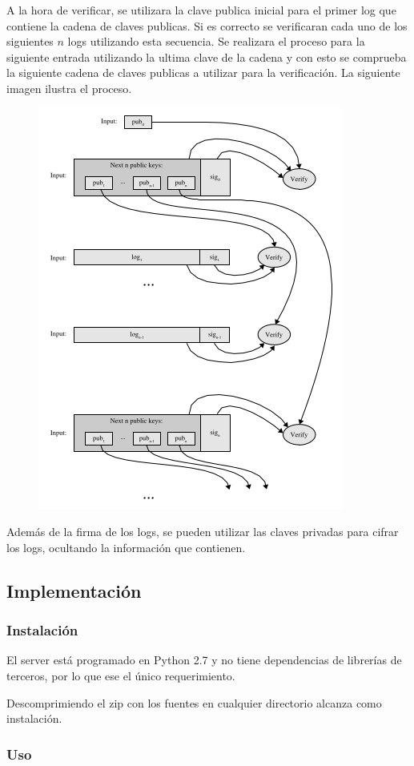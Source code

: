 A la hora de verificar, se utilizara la clave publica inicial para el primer log que contiene la cadena de claves publicas. Si es correcto se verificaran cada uno de los siguientes $n$ logs utilizando esta secuencia. Se realizara el proceso para la siguiente entrada utilizando la ultima clave de la cadena y con esto se comprueba la siguiente cadena de claves publicas a utilizar para la verificación. La siguiente imagen ilustra el proceso.
\begin{figure}[H]
\centering
\includegraphics[scale=0.4]{imagenes/PublicKeyVerification.png}
\end{figure}
  
Además de la firma de los logs, se pueden utilizar las claves privadas para cifrar los logs, ocultando la información que contienen.

\subsection{Implementación}

\subsubsection{Instalación}

El server está programado en Python 2.7 y no tiene dependencias de librerías de terceros, por lo que ese el único requerimiento.

Descomprimiendo el zip con los fuentes en cualquier directorio alcanza como instalación.


\subsubsection{Uso}







